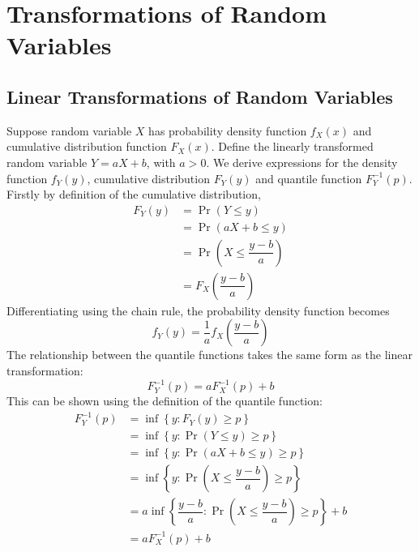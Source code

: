 \documentclass[11pt]{report} %
\begin{document}
\section{Transformations of Random Variables}

\subsection{Linear Transformations of Random Variables}

Suppose random variable $X$ has probability density function $f_{X}\left(x\right)$ and cumulative distribution function $F_{X}\left(x\right)$. Define the linearly transformed random variable $Y = aX + b$, with $a > 0$. We derive expressions for the density function $f_{Y}\left(y\right)$, cumulative distribution $F_{Y}\left(y\right)$ and quantile function $F_{Y}^{-1}\left(p\right)$. Firstly by definition of the cumulative distribution,
\begin{align}
F_{Y}\left(y\right) &= \operatorname{Pr}\left(Y \leq y\right) \\
&= \operatorname{Pr}\left(aX + b \leq y\right) \\
&= \operatorname{Pr}\left(X \leq \dfrac{y - b}{a}\right) \\
&= F_{X}\left(\dfrac{y - b}{a}\right)
\end{align}
Differentiating using the chain rule, the probability density function becomes
\begin{equation}
f_{Y}\left(y\right) = \dfrac{1}{a}f_{X}\left(\dfrac{y - b}{a}\right)
\end{equation}
The relationship between the quantile functions takes the same form as the linear transformation:
\begin{equation}
F_{Y}^{-1}\left(p\right) = aF_{X}^{-1}\left(p\right) + b
\end{equation}
This can be shown using the definition of the quantile function:
\begin{align}
F_{Y}^{-1}\left(p\right) &= \inf\left\{y: F_{Y}\left(y\right) \geq p\right\} \\
&= \inf\left\{y: \operatorname{Pr}\left(Y \leq y\right) \geq p\right\} \\
&= \inf\left\{y: \operatorname{Pr}\left(aX + b \leq y\right) \geq p\right\} \\
&= \inf\left\{y: \operatorname{Pr}\left(X \leq \dfrac{y - b}{a}\right) \geq p\right\} \\
&= a\inf\left\{\dfrac{y - b}{a}: \operatorname{Pr}\left(X \leq \dfrac{y - b}{a}\right) \geq p\right\} + b \\
&= aF_{X}^{-1}\left(p\right) + b
\end{align}
\end{document}
